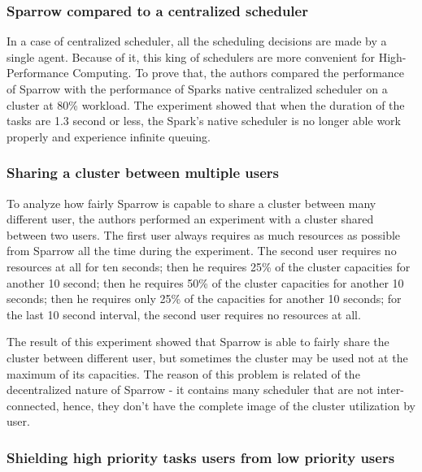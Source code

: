 \documentclass[11pt]{article}
\begin{document}
        
        \subsubsection*{Sparrow compared to a centralized scheduler}
        
        	In a case of centralized scheduler, all the scheduling decisions are made by a single agent. Because of it, this king of schedulers are more convenient for High-Performance Computing. To prove that, the authors compared the performance of Sparrow with the performance of Sparks native centralized scheduler on a cluster at 80\% workload. The experiment showed that when the duration of the tasks are 1.3 second or less, the Spark's native scheduler is no longer able work properly and experience infinite queuing.
        
        
        \subsubsection*{Sharing a cluster between multiple users}
        
        	To analyze how fairly Sparrow is capable to share a cluster between many different user, the authors performed an experiment with a cluster shared between two users. The first user always requires as much resources as possible from Sparrow all the time during the experiment. The second user requires no resources at all for ten seconds; then he requires 25\% of the cluster capacities for another 10 second; then he requires 50\% of the cluster capacities for another 10 seconds; then he requires only 25\% of the capacities for another 10 seconds; for the last 10 second interval, the second user requires no resources at all.
            
            The result of this experiment showed that Sparrow is able to fairly share the cluster between different user, but sometimes the cluster may be used not at the maximum of its capacities. The reason of this problem is related of the decentralized nature of Sparrow - it contains many scheduler that are not inter-connected, hence, they don't have the complete image of the cluster utilization by user.
        
        
        \subsubsection*{Shielding high priority tasks users from low priority users}
        	 \label{preemption}
        	
\end{document}
